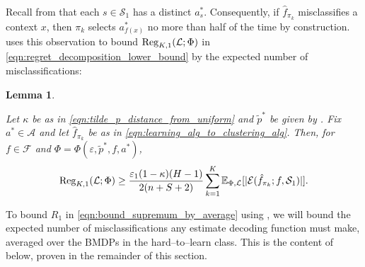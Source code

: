 \documentclass[11pt]{article}
\newcommand{\mcA}{\mathcal{A}}
\newcommand{\mcE}{\mathcal{E}}
\newcommand{\mcF}{\mathcal{F}}
\newcommand{\mcL}{\mathcal{L}}
\newcommand{\mcS}{\mathcal{S}}
\newcommand{\mbbE}{\mathbb{E}}
\newcommand{\reg}{\textnormal{Reg}}
\newtheorem{lemma}[theorem]{Lemma}
\theoremstyle{definition}
\theoremstyle{definition}
\begin{document}
Recall from  that each $s\in\mcS_1$ has a distinct $a_s^*$.
Consequently, if $\hat{f}_{\pi_k}$ misclassifies a context $x$, then $\pi_k$ selects $a_{f(x)}^*$ no more than half of the time by construction.
 uses this observation to bound $\reg_{K,1}(\mcL;\Phi)$ in \eqref{eqn:regret_decomposition_lower_bound} by the expected number of misclassifications:
\begin{lemma}
	\label{lem:relation_between_regret_and_clustering_error}

	Let $\kappa$ be as in \eqref{eqn:tilde_p_distance_from_uniform} and $\tilde{p}^*$ be given by .
	Fix $a^*\in\mcA$ and let $\hat{f}_{\pi_k}$ be as in \eqref{eqn:learning_alg_to_clustering_alg}.
	Then, for $f\in\mcF$ and $\Phi=\Phi(\varepsilon,\tilde{p}^*,f,a^*)$,
	\begin{equation}
		\reg_{K,1}(\mcL;\Phi)
		\geq
		\frac{\varepsilon_1(1-\kappa)(H-1)}{2(n+S+2)}
		\sum_{k=1}^K
		\mbbE_{\Phi,\mcL}[|\mcE(\hat{f}_{\pi_k}; f, \mcS_1)|]
		.
	\end{equation}
\end{lemma}

To bound $R_1$ in \eqref{eqn:bound_supremum_by_average} using , we will bound the expected number of misclassifications any estimate decoding function must make, averaged over the \glspl{BMDP} in the hard--to--learn class.
This is the content of  below, proven in the remainder of this section.
\end{document}
